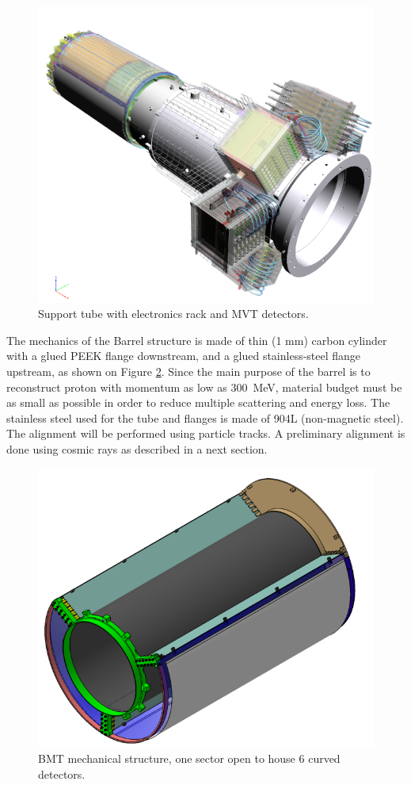 \begin{figure}[htb]
 \includegraphics[width=1.0\columnwidth,keepaspectratio]{images/fig2}
 \caption{Support tube with electronics rack and MVT detectors.}
 \label{fig:mm-fig2}
\end{figure}

The mechanics of the Barrel structure is made of thin (1 mm) carbon cylinder with a glued PEEK flange downstream, and a glued stainless-steel flange upstream, as shown on Figure \ref{fig:mm-fig3}. Since the main purpose of the barrel is to reconstruct proton with momentum as low as 300~MeV, material budget must be as small as possible in order to reduce multiple scattering and energy loss.
The stainless steel used for the tube and flanges is made of 904L (non-magnetic steel). The alignment will be performed using particle tracks. A preliminary alignment is done using cosmic rays as described in a next section.

\begin{figure}[htb]
 \includegraphics[width=1.0\columnwidth,keepaspectratio]{images/fig3}
 \caption{BMT mechanical structure, one sector open to house 6 curved detectors.}
 \label{fig:mm-fig3}
\end{figure}


